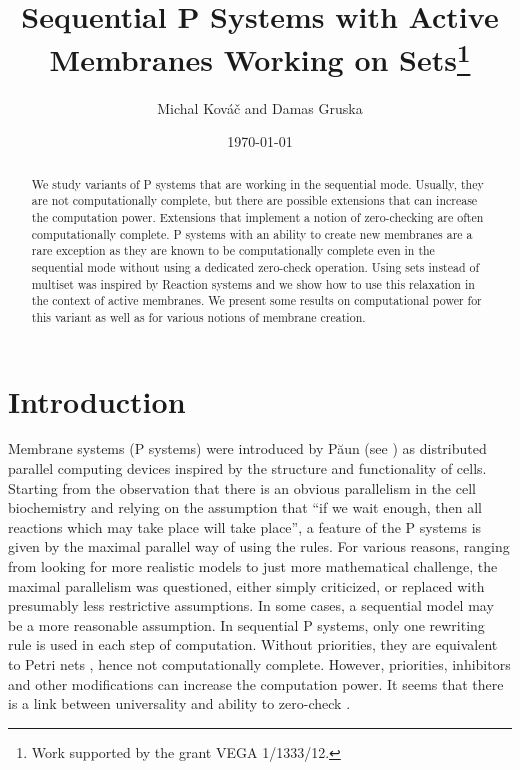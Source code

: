 \documentclass[llncs,submission,copyright,creativecommons]{../lib/lncs/llncs}
\begin{document}
\title{Sequential P Systems with Active Membranes Working on Sets\thanks{Work supported by the grant VEGA 1/1333/12.}}
\author{Michal Kováč and Damas Gruska}
\date{\today}
\maketitle

\begin{abstract}
We study variants of P systems that are working in the sequential mode. Usually, they are not computationally complete, but there are possible extensions that can increase the computation power. Extensions that implement a notion of zero-checking are often computationally complete.
P systems with an ability to create new membranes are a rare exception as they are known to be computationally complete even in the sequential mode without using a dedicated zero-check operation. Using sets instead of multiset was inspired by Reaction systems and we show how to use this relaxation in the context of active membranes. We present some results on computational power for this variant as well as for various notions of membrane creation.
\end{abstract}

\section{Introduction}
\label{sec:introduction}


Membrane systems (P systems) \cite{Paun10OxfordHandbookMembraneComputing} were introduced by P\u{a}un (see \cite{Paun2000108}) as distributed parallel computing devices inspired by the structure and functionality of cells. Starting from the observation that there is an obvious parallelism in the cell biochemistry and relying on the assumption that ``if we wait enough, then all reactions which may take place will take place'', a feature of the P systems is given by the maximal parallel way of using the rules. For various reasons, ranging from looking for more realistic models to just more mathematical challenge, the maximal parallelism was questioned, either simply criticized, or replaced with presumably less restrictive assumptions.
In some cases, a sequential model may be a more reasonable assumption. In sequential P systems, only one rewriting rule is used in each step of computation. Without priorities, they are equivalent to Petri nets \cite{Ibarra05Active}, hence not computationally complete. However, priorities, inhibitors and other modifications can increase the computation power. It seems that there is a link between universality and ability to zero-check \cite{Alhazov12Properties}.
\end{document}
